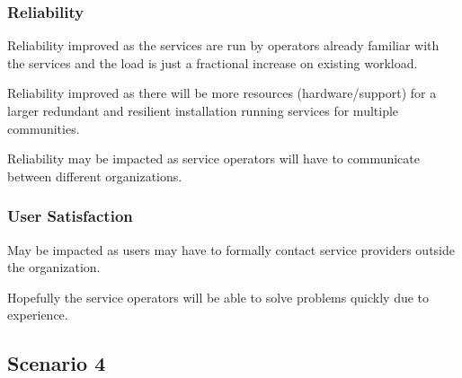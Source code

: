 \documentclass[12pt,a4paper]{article}
\begin{document}
\subsubsection*{Reliability}
\bitm
  \item Reliability improved as the services are run by operators already familiar with the services and the \ED load is just a fractional increase on existing workload.
  \item {Reliability improved as there will be more resources (hardware/support) for a larger redundant and resilient \einfra installation running services for multiple communities.}
  \item {Reliability may be impacted as service operators will have to communicate between different organizations.}
\eitm

\subsubsection*{User Satisfaction}
\bitm
  \item May be impacted as users may have to formally contact service providers outside the \EC organization.
  \item Hopefully the service operators will be able to solve problems quickly due to experience.
\eitm

\subsection{Scenario 4}
\label{ssec:scen4}
\end{document}
